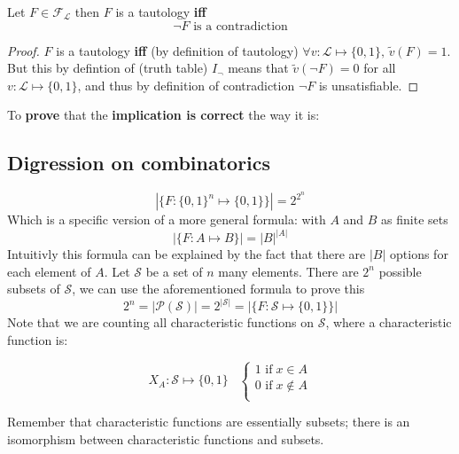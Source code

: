 	\begin{fact} Let $F \in \mathcal{F}_\mathcal{L}$ then $F$ is a tautology \textbf{iff}
	  $$ \neg F \text{ is a contradiction}$$
	\end{fact}

	\begin{proof}
		$F$ is a tautology \textbf{iff} (by definition of tautology)  $\forall v: \mathcal{L} \mapsto \{0,1\}, \, \tilde{v} (F) = 1$. But this by defintion of (truth table) $I_\neg$ means that $\tilde{v} (\neg F) = 0$ for all $v: \mathcal{L} \mapsto \{0,1\}$, and thus by definition of contradiction $\neg F$ is unsatisfiable.
	\end{proof}

	To \textbf{prove} that the \textbf{implication is correct} the way it is:

	\label{combinatorics}
	\subsection{Digression on combinatorics}
		$$ |\{F : \{0,1\}^n \mapsto \{0,1\} \}| = 2^{2^n} $$
		Which is a specific version of a more general formula: with $A$ and $B$ as finite sets
		$$ |\{F : A \mapsto B \}| = |B|^{|A|} $$
		Intuitivly this formula can be explained by the fact that there are $|B|$ options for each element of $A$. Let $\mathcal{S}$ be a set of $n$ many elements. There are $2^n$ possible subsets of $\mathcal{S}$, we can use the aforementioned formula to prove this
		$$ 2^n = |\mathcal{P} (\mathcal{S})| = 2^{|\mathcal{S}|} = |\{F : \mathcal{S} \mapsto \{0,1\}\}|$$
		Note that we are counting all characteristic functions on $\mathcal{S}$, where a characteristic function is:

		$$ X_A :  \mathcal{S} \mapsto \{0,1\} \;\;\;
		\begin{cases}
			1 \text{ if} \; x \in A \\
			0 \text{ if} \; x \notin A \\
		\end{cases}
		$$

		Remember that characteristic functions are essentially subsets; there is an isomorphism between characteristic functions and subsets.

